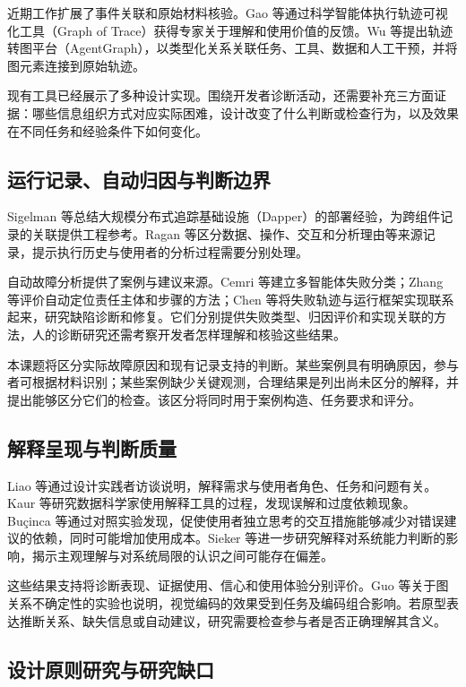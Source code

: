 近期工作扩展了事件关联和原始材料核验。Gao 等\cite{ref24}通过科学智能体执行轨迹可视化工具（Graph of Trace）获得专家关于理解和使用价值的反馈。Wu 等\cite{ref23}提出轨迹转图平台（AgentGraph），以类型化关系关联任务、工具、数据和人工干预，并将图元素连接到原始轨迹。

现有工具已经展示了多种设计实现。围绕开发者诊断活动，还需要补充三方面证据：哪些信息组织方式对应实际困难，设计改变了什么判断或检查行为，以及效果在不同任务和经验条件下如何变化。

\subsection{运行记录、自动归因与判断边界}

Sigelman 等\cite{ref32}总结大规模分布式追踪基础设施（Dapper）的部署经验，为跨组件记录的关联提供工程参考。Ragan 等\cite{ref36}区分数据、操作、交互和分析理由等来源记录，提示执行历史与使用者的分析过程需要分别处理。

自动故障分析提供了案例与建议来源。Cemri 等\cite{cemri2025mast}建立多智能体失败分类；Zhang 等\cite{ref03}评价自动定位责任主体和步骤的方法；Chen 等\cite{ref20}将失败轨迹与运行框架实现联系起来，研究缺陷诊断和修复。它们分别提供失败类型、归因评价和实现关联的方法，人的诊断研究还需考察开发者怎样理解和核验这些结果。

本课题将区分实际故障原因和现有记录支持的判断。某些案例具有明确原因，参与者可根据材料识别；某些案例缺少关键观测，合理结果是列出尚未区分的解释，并提出能够区分它们的检查。该区分将同时用于案例构造、任务要求和评分。

\subsection{解释呈现与判断质量}

Liao 等\cite{ref49}通过设计实践者访谈说明，解释需求与使用者角色、任务和问题有关。Kaur 等\cite{ref50}研究数据科学家使用解释工具的过程，发现误解和过度依赖现象。Buçinca 等\cite{ref55}通过对照实验发现，促使使用者独立思考的交互措施能够减少对错误建议的依赖，同时可能增加使用成本。Sieker 等\cite{ref56}进一步研究解释对系统能力判断的影响，揭示主观理解与对系统局限的认识之间可能存在偏差。

这些结果支持将诊断表现、证据使用、信心和使用体验分别评价。Guo 等\cite{ref62}关于图关系不确定性的实验也说明，视觉编码的效果受到任务及编码组合影响。若原型表达推断关系、缺失信息或自动建议，研究需要检查参与者是否正确理解其含义。

\subsection{设计原则研究与研究缺口}

